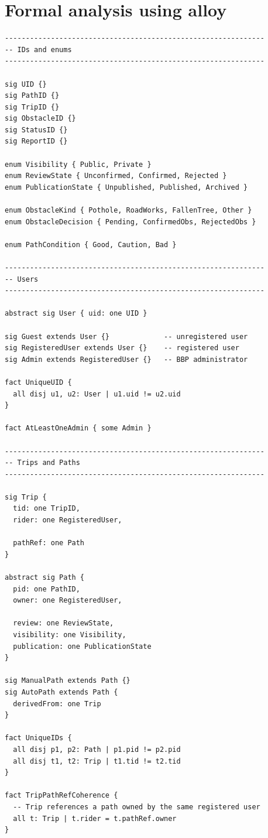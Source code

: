 \section{Formal analysis using alloy}

\begin{lstlisting}
--------------------------------------------------------------
-- IDs and enums
--------------------------------------------------------------

sig UID {}
sig PathID {}
sig TripID {}
sig ObstacleID {}
sig StatusID {}
sig ReportID {}

enum Visibility { Public, Private }
enum ReviewState { Unconfirmed, Confirmed, Rejected }
enum PublicationState { Unpublished, Published, Archived }

enum ObstacleKind { Pothole, RoadWorks, FallenTree, Other }
enum ObstacleDecision { Pending, ConfirmedObs, RejectedObs }

enum PathCondition { Good, Caution, Bad }

--------------------------------------------------------------
-- Users
--------------------------------------------------------------

abstract sig User { uid: one UID }

sig Guest extends User {}             -- unregistered user
sig RegisteredUser extends User {}    -- registered user
sig Admin extends RegisteredUser {}   -- BBP administrator

fact UniqueUID {
  all disj u1, u2: User | u1.uid != u2.uid
}

fact AtLeastOneAdmin { some Admin }

--------------------------------------------------------------
-- Trips and Paths
--------------------------------------------------------------

sig Trip {
  tid: one TripID,
  rider: one RegisteredUser,

  pathRef: one Path
}

abstract sig Path {
  pid: one PathID,
  owner: one RegisteredUser,

  review: one ReviewState,
  visibility: one Visibility,
  publication: one PublicationState
}

sig ManualPath extends Path {}
sig AutoPath extends Path {
  derivedFrom: one Trip
}

fact UniqueIDs {
  all disj p1, p2: Path | p1.pid != p2.pid
  all disj t1, t2: Trip | t1.tid != t2.tid
}

fact TripPathRefCoherence {
  -- Trip references a path owned by the same registered user
  all t: Trip | t.rider = t.pathRef.owner
}


\end{lstlisting}
